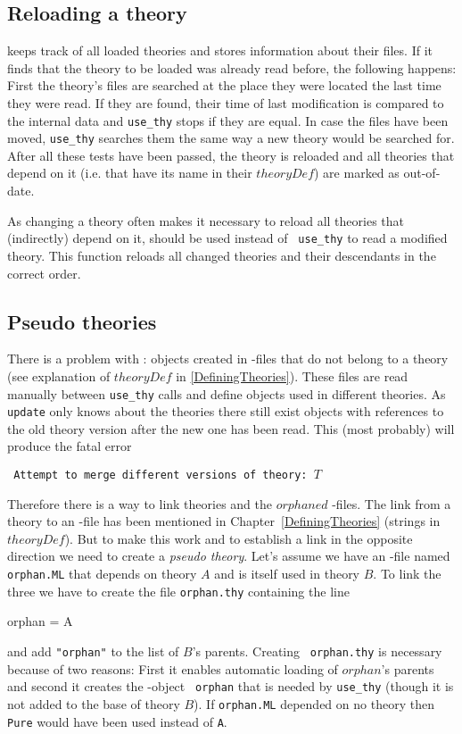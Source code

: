 \subsection{Reloading a theory}

 keeps track of all loaded theories and stores information
about their files.  If it finds that the theory to be loaded was already read
before, the following happens: First the theory's files are searched at the
place they were located the last time they were read. If they are found, their
time of last modification is compared to the internal data and {\tt use_thy}
stops if they are equal. In case the files have been moved, {\tt use_thy}
searches them the same way a new theory would be searched for.  After all these
tests have been passed, the theory is reloaded and all theories that depend on
it (i.e. that have its name in their $theoryDef$) are marked as out-of-date.

As changing a theory often makes it necessary to reload all theories that
(indirectly) depend on it,  should be used instead of {\tt
use_thy} to read a modified theory.  This function reloads all changed
theories and their descendants in the correct order.


\subsection{Pseudo theories}

There is a problem with : objects created in \ML-files that do
not belong to a theory (see explanation of $theoryDef$ in
\ref{DefiningTheories}).  These files are read manually between {\tt use_thy}
calls and define objects used in different theories.  As {\tt update} only
knows about the theories there still exist objects with references to the old
theory version after the new one has been read.  This (most probably) will
produce the fatal error
\begin{center} \tt
Attempt to merge different versions of theory: $T$
\end{center}

Therefore there is a way to link theories and the $orphaned$ \ML-files. The
link from a theory to an \ML-file has been mentioned in
Chapter~\ref{DefiningTheories} (strings in $theoryDef$).  But to make this
work and to establish a link in the opposite direction we need to create a
{\it pseudo theory}.  Let's assume we have an \ML-file named {\tt orphan.ML}
that depends on theory $A$ and is itself used in theory $B$.  To link the
three we have to create the file {\tt orphan.thy} containing the line
\begin{ttbox}
orphan = A
\end{ttbox}
and add {\tt "orphan"} to the list of $B$'s parents.  Creating {\tt
  orphan.thy} is necessary because of two reasons: First it enables automatic
loading of $orphan$'s parents and second it creates the \ML{}-object {\tt
  orphan} that is needed by {\tt use_thy} (though it is not added to the base
of theory $B$).  If {\tt orphan.ML} depended on no theory then {\tt Pure}
would have been used instead of {\tt A}.

